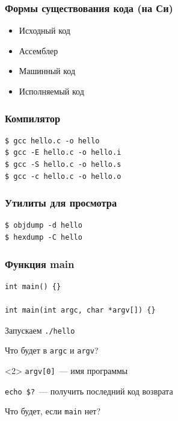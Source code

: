 \documentclass[aspectratio=169]{beamer}
\begin{document}
\begin{frame}
    \frametitle{Формы существования кода (на Си)}

    \begin{itemize}
        \item Исходный код
        \item Ассемблер
        \item Машинный код
        \item Исполняемый код
    \end{itemize}

\end{frame}

\begin{frame}[fragile]
    \frametitle{Компилятор}

    \begin{verbatim}
$ gcc hello.c -o hello
$ gcc -E hello.c -o hello.i
$ gcc -S hello.c -o hello.s
$ gcc -c hello.c -o hello.o
    \end{verbatim}

\end{frame}

\begin{frame}[fragile]
    \frametitle{Утилиты для просмотра}

    \begin{verbatim}
$ objdump -d hello
$ hexdump -C hello
    \end{verbatim}

\end{frame}

\begin{frame}[fragile]
    \frametitle{Функция main}

    \begin{verbatim}
int main() {}

int main(int argc, char *argv[]) {}
    \end{verbatim}

    Запускаем \texttt{./hello}

    Что будет в \texttt{argc} и \texttt{argv}?

    \vspace{1em}

    \begin{onlyenv}<2>
        \texttt{argv[0]}~--- имя программы

        \texttt{echo \$?}~--- получить последний код возврата

        Что будет, если \texttt{main} нет?
    \end{onlyenv}

\end{frame}
\end{document}

